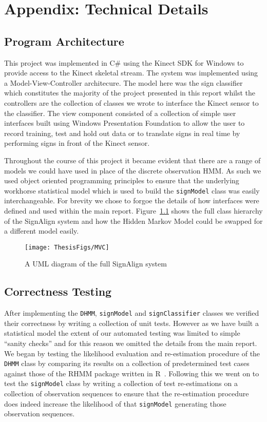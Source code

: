 \chapter{Appendix: Technical Details}

\section{Program Architecture}
This project was implemented in C\# using the Kinect SDK for Windows to provide access to the Kinect skeletal stream. The system was implemented using a Model-View-Controller architecure. The model here was the sign classifier which constitutes the majority of the project presented in this report whilst the controllers are the collection of classes we wrote to interface the Kinect sensor to the classifier. The view component consisted of a collection of simple user interfaces built using Windows Presentation Foundation to allow the user to record training, test and hold out data or to translate signs in real time by performing signs in front of the Kinect sensor.

Throughout the course of this project it became evident that there are a range of models we could have used in place of the discrete observation HMM. As such we used object oriented programming principles to ensure that the underlying workhorse statistical model which is used to build the \verb|signModel| class was easily interchangeable. For brevity we chose to forgoe the details of how interfaces were defined and used within the main report. Figure~\ref{fig:mvc} shows the full class hierarchy of the SignAlign system and how the Hidden Markov Model could be swapped for a different model easily.

\begin{figure}[t]
        \centering
        \texttt{[image: ThesisFigs/MVC]}
        \caption{A UML diagram of the full SignAlign system}\label{fig:mvc}
\end{figure}

\section{Correctness Testing}
After implementing the \verb|DHMM|, \verb|signModel| and \verb|signClassifier| classes we verified their correctness by writing a collection of unit tests. However as we have built a statistical model the extent of our automated testing was limited to simple ``sanity checks'' and for this reason we omitted the details from the main report. We began by testing the likelihood evaluation and re-estimation procedure of the \verb|DHMM| class by comparing its results on a collection of predetermined test cases against those of the RHMM package written in R~\citep{RhmmPac}. Following this we went on to test the \verb|signModel| class by writing a collection of test re-estimations on a collection of observation sequences to ensure that the re-estimation procedure does indeed increase the likelihood of that \verb|signModel| generating those observation sequences. 

